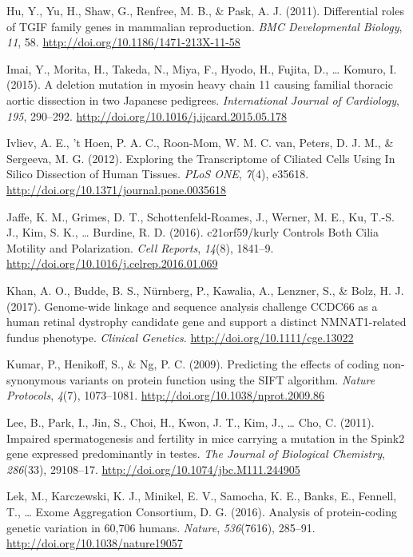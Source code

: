 \documentclass[12pt,twoside]{reedthesis}
\theoremstyle{definition}
\theoremstyle{definition}
\theoremstyle{remark}
\begin{document}
  \hypertarget{ref-Hu2011}{}
  Hu, Y., Yu, H., Shaw, G., Renfree, M. B., \& Pask, A. J. (2011).
  Differential roles of TGIF family genes in mammalian reproduction.
  \emph{BMC Developmental Biology}, \emph{11}, 58.
  \url{http://doi.org/10.1186/1471-213X-11-58}
  
  \hypertarget{ref-Imai2015}{}
  Imai, Y., Morita, H., Takeda, N., Miya, F., Hyodo, H., Fujita, D.,
  \ldots{} Komuro, I. (2015). A deletion mutation in myosin heavy chain 11
  causing familial thoracic aortic dissection in two Japanese pedigrees.
  \emph{International Journal of Cardiology}, \emph{195}, 290--292.
  \url{http://doi.org/10.1016/j.ijcard.2015.05.178}
  
  \hypertarget{ref-Ivliev2012}{}
  Ivliev, A. E., 't Hoen, P. A. C., Roon-Mom, W. M. C. van, Peters, D. J.
  M., \& Sergeeva, M. G. (2012). Exploring the Transcriptome of Ciliated
  Cells Using In Silico Dissection of Human Tissues. \emph{PLoS ONE},
  \emph{7}(4), e35618. \url{http://doi.org/10.1371/journal.pone.0035618}
  
  \hypertarget{ref-Jaffe2016}{}
  Jaffe, K. M., Grimes, D. T., Schottenfeld-Roames, J., Werner, M. E., Ku,
  T.-S. J., Kim, S. K., \ldots{} Burdine, R. D. (2016). c21orf59/kurly
  Controls Both Cilia Motility and Polarization. \emph{Cell Reports},
  \emph{14}(8), 1841--9. \url{http://doi.org/10.1016/j.celrep.2016.01.069}
  
  \hypertarget{ref-Khan2017}{}
  Khan, A. O., Budde, B. S., Nürnberg, P., Kawalia, A., Lenzner, S., \&
  Bolz, H. J. (2017). Genome-wide linkage and sequence analysis challenge
  CCDC66 as a human retinal dystrophy candidate gene and support a
  distinct NMNAT1-related fundus phenotype. \emph{Clinical Genetics}.
  \url{http://doi.org/10.1111/cge.13022}
  
  \hypertarget{ref-Kumar2009}{}
  Kumar, P., Henikoff, S., \& Ng, P. C. (2009). Predicting the effects of
  coding non-synonymous variants on protein function using the SIFT
  algorithm. \emph{Nature Protocols}, \emph{4}(7), 1073--1081.
  \url{http://doi.org/10.1038/nprot.2009.86}
  
  \hypertarget{ref-Lee2011}{}
  Lee, B., Park, I., Jin, S., Choi, H., Kwon, J. T., Kim, J., \ldots{}
  Cho, C. (2011). Impaired spermatogenesis and fertility in mice carrying
  a mutation in the Spink2 gene expressed predominantly in testes.
  \emph{The Journal of Biological Chemistry}, \emph{286}(33), 29108--17.
  \url{http://doi.org/10.1074/jbc.M111.244905}
  
  \hypertarget{ref-Lek2016}{}
  Lek, M., Karczewski, K. J., Minikel, E. V., Samocha, K. E., Banks, E.,
  Fennell, T., \ldots{} Exome Aggregation Consortium, D. G. (2016).
  Analysis of protein-coding genetic variation in 60,706 humans.
  \emph{Nature}, \emph{536}(7616), 285--91.
  \url{http://doi.org/10.1038/nature19057}
  
\end{document}
